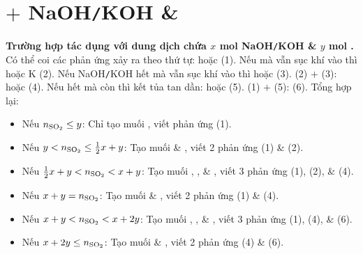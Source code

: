 \documentclass{article}
\begin{document}
\section{ $+$ NaOH{\tt/}KOH \& }
\textbf{\textsf{Trường hợp  tác dụng với dung dịch chứa $x$ mol NaOH{\tt/}KOH \& $y$ mol .}} Có thể coi các phản ứng xảy ra theo thứ tự:  hoặc  (1). Nếu  mà vẫn sục khí  vào thì  hoặc K (2). Nếu NaOH{\tt/}KOH hết mà vẫn sục khí  vào thì  hoặc  (3). (2) $+$ (3):  hoặc  (4). Nếu  hết mà  còn thì kết tủa tan dần:  hoặc  (5). (1) $+$ (5):  (6). Tổng hợp lại:
\begin{itemize}
	\item Nếu $n_{\ce{SO2}}\le y$: Chỉ tạo muối , viết phản ứng (1).
	\item Nếu $y < n_{\ce{SO2}}\le\frac{1}{2}x + y$: Tạo muối  \& , viết 2 phản ứng (1) \& (2).
	\item Nếu $\frac{1}{2}x + y < n_{\ce{SO2}} < x + y$: Tạo muối , , \& , viết 3 phản ứng (1), (2), \& (4).
	\item Nếu $x + y = n_{\ce{SO2}}$: Tạo muối  \& , viết 2 phản ứng (1) \& (4).
	\item Nếu $x + y < n_{\ce{SO2}} < x + 2y$: Tạo muối , , \& , viết 3 phản ứng (1), (4), \& (6).
	\item Nếu $x + 2y\le n_{\ce{SO2}}$: Tạo muối  \& , viết 2 phản ứng (4) \& (6).
\end{itemize}

\end{document}
